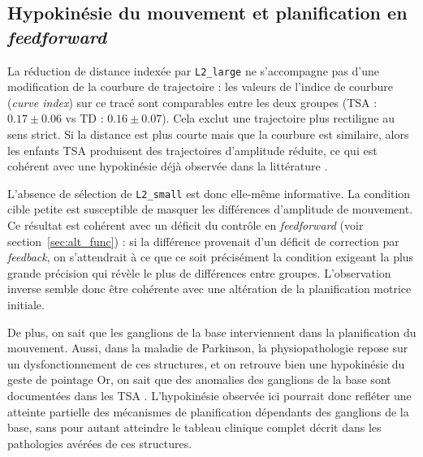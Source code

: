 \subsection{Hypokinésie du mouvement et planification en \textit{feedforward}}

La réduction de distance indexée par \texttt{L2\_large} ne s'accompagne pas d'une modification de la courbure de trajectoire : les valeurs de l'indice de courbure (\textit{curve index}) sur ce tracé sont comparables entre les deux groupes (TSA : $0.17 \pm 0.06$ vs TD : $0.16 \pm 0.07$). Cela exclut une trajectoire plus rectiligne au sens strict. Si la distance est plus courte mais que la courbure est similaire, alors les enfants TSA produisent des trajectoires d'amplitude réduite, ce qui est cohérent avec une hypokinésie déjà observée dans la littérature \parencite{Zhang2025Sep}. 

L'absence de sélection de \texttt{L2\_small} est donc elle-même informative. La condition cible petite est susceptible de masquer les différences d'amplitude de mouvement. Ce résultat est cohérent avec un déficit du contrôle en \textit{feedforward} (voir section~\ref{sec:alt_func}) : si la différence provenait d'un déficit de correction par \textit{feedback}, on s'attendrait à ce que ce soit précisément la condition exigeant la plus grande précision qui révèle le plus de différences entre groupes. L'observation inverse semble donc être cohérente avec une altération de la planification motrice initiale.

\medskip 

De plus, on sait que les ganglions de la base interviennent dans la planification du mouvement\break\parencite{Desmurget2004May}. Aussi, dans la maladie de Parkinson, la physiopathologie repose sur un dysfonctionnement de ces structures, et on retrouve bien une hypokinésie du geste de pointage \parencite{Mazzoni2012Mar}%
Or, on sait que des anomalies des ganglions de la base sont documentées dans les TSA \parencite{McAlonan2009Nov}. %
L'hypokinésie observée ici pourrait donc refléter une atteinte partielle des mécanismes de planification dépendants des ganglions de la base, sans pour autant atteindre le tableau clinique complet décrit dans les pathologies avérées de ces structures.

